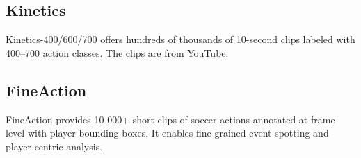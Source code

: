 \subsection{Kinetics}
Kinetics-400/600/700 \cite{dataset:kinetics} offers hundreds of thousands of 10-second clips labeled with 400–700 action classes. The clips are from YouTube.

\subsection{FineAction}
FineAction \cite{dataset:fineaction} provides 10 000+ short clips of soccer actions annotated at frame level with player bounding boxes. It enables fine-grained event spotting and player-centric analysis.








